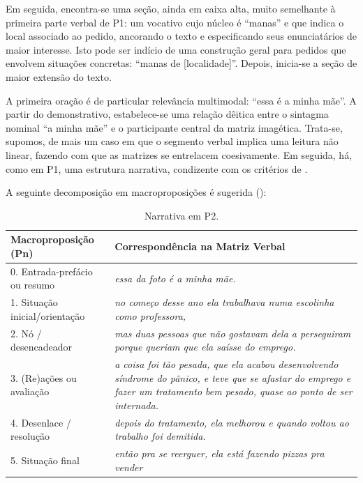 \documentclass{textolivre-html}
\begin{document}
Em seguida, encontra-se uma seção, ainda em caixa alta, muito semelhante à primeira parte verbal de P1: um vocativo cujo núcleo é “manas” e que indica o local associado ao pedido, ancorando o texto e especificando seus enunciatários de maior interesse. Isto pode ser indício de uma construção geral para pedidos que envolvem situações concretas: “manas de [localidade]”. Depois, inicia-se a seção de maior extensão do texto.

A primeira oração é de particular relevância multimodal: “essa é a minha mãe”. A partir do demonstrativo, estabelece-se uma relação dêitica entre o sintagma nominal “a minha mãe” e o participante central da matriz imagética. Trata-se, supomos, de mais um caso em que o segmento verbal implica uma leitura não linear, fazendo com que as matrizes se entrelacem coesivamente. Em seguida, há, como em P1, uma estrutura narrativa, condizente com os critérios de \textcite{adam1992}.

A seguinte decomposição em macroproposições é sugerida ():

\begin{table}[htpb]
\caption{Narrativa em P2.}
\label{tbl-tabela-02}
\begin{tabular}{lp{}}
\toprule
Macroproposição (Pn) & Correspondência na Matriz Verbal\\
\midrule                                                                                               
0. Entrada-prefácio ou resumo  & \textit{essa da foto é a minha mãe.}\\
1. Situação inicial/orientação & \textit{no começo desse ano ela trabalhava numa escolinha como professora,}\\
2. Nó / desencadeador          & \textit{mas duas pessoas que não gostavam dela a perseguiram porque queriam que ela saísse do emprego.}\\
3. (Re)ações ou avaliação      & \textit{a coisa foi tão pesada, que ela acabou desenvolvendo síndrome do pânico, e teve que se afastar do emprego e fazer um tratamento bem pesado, quase ao ponto de ser internada.} \\
4. Desenlace / resolução       & \textit{depois do tratamento, ela melhorou e quando voltou ao trabalho foi demitida.} \\
5. Situação final              & \textit{então pra se reerguer, ela está fazendo pizzas pra vender} \\
\bottomrule
\end{tabular}
\end{table}
\end{document}
